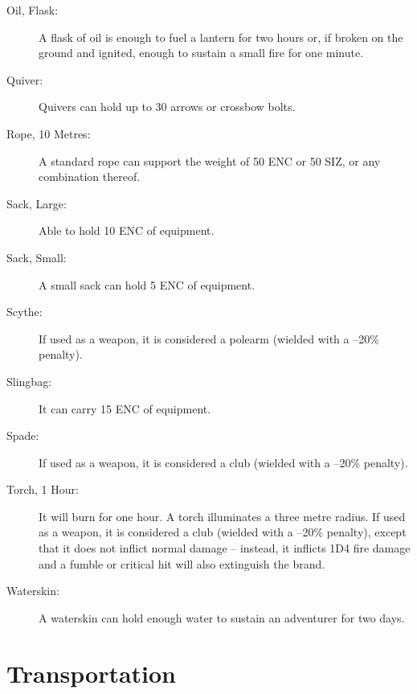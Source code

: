 \begin{description}
	\item[Oil, Flask:] A flask of oil is enough to fuel a lantern for two hours or, if broken on the ground and ignited, enough to sustain a small fire for one minute. 
	\item[Quiver:] Quivers can hold up to 30 arrows or crossbow bolts. 
	\item[Rope, 10 Metres:] A standard rope can support the weight of 50 ENC or 50 SIZ, or any combination thereof. 
	\item[Sack, Large:] Able to hold 10 ENC of equipment. 
	\item[Sack, Small:] A small sack can hold 5 ENC of equipment. 
	\item[Scythe:] If used as a weapon, it is considered a polearm (wielded with a –20\% penalty). 
	\item[Slingbag:] It can carry 15 ENC of equipment. 
	\item[Spade:] If used as a weapon, it is considered a club (wielded with a –20\% penalty). 
	\item[Torch, 1 Hour:] It will burn for one hour. A torch illuminates a three metre radius. If used as a weapon, it is considered a club (wielded with a –20\% penalty), except that it does not inflict normal damage – instead, it inflicts 1D4 fire damage and a fumble or critical hit will also extinguish the brand. 
	\item[Waterskin:] A waterskin can hold enough water to sustain an adventurer for two days.
\end{description}

\section{Transportation}

